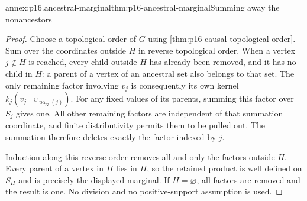 \begin{annexitem}{annex:p16.ancestral-marginal}{thm:p16-ancestral-marginal}{Summing away the nonancestors}
\begin{proof}
Choose a topological order of \(G\) using
\cref{thm:p16-causal-topological-order}. Sum over the coordinates
outside \(H\) in reverse topological order. When a vertex
\(j\notin H\) is reached, every child outside \(H\) has already
been removed, and it has no child in \(H\): a parent of a vertex
of an ancestral set also belongs to that set. The only remaining
factor involving \(v_j\) is consequently its own kernel
\(k_j(v_j\mid v_{\operatorname{pa}_G(j)})\).
For any fixed values of its parents, summing this factor over \(S_j\)
gives one. All other remaining factors are independent of that summation
coordinate, and finite distributivity permits them to be pulled out.
The summation therefore deletes exactly the factor indexed by \(j\).

Induction along this reverse order removes all and only the factors
outside \(H\). Every parent of a vertex in \(H\) lies in \(H\),
so the retained product is well defined on \(S_H\) and is precisely
the displayed marginal. If \(H=\varnothing\), all factors are
removed and the result is one. No division and no positive-support
assumption is used.
\end{proof}
\end{annexitem}

